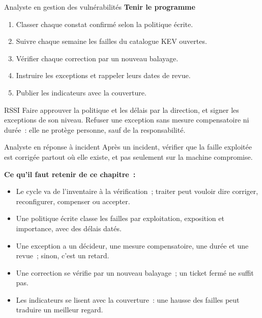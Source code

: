 \begin{boxmetier}{Analyste en gestion des vulnérabilités}
\textbf{Tenir le programme}
\begin{enumerate}
    \item Classer chaque constat confirmé selon la politique écrite.
    \item Suivre chaque semaine les failles du catalogue KEV ouvertes.
    \item Vérifier chaque correction par un nouveau balayage.
    \item Instruire les exceptions et rappeler leurs dates de revue.
    \item Publier les indicateurs avec la couverture.
\end{enumerate}
\end{boxmetier}

\begin{boxmetier}{RSSI}
Faire approuver la politique et les délais par la direction, et signer les
exceptions de son niveau. Refuser une exception sans mesure compensatoire ni
durée~: elle ne protège personne, sauf de la responsabilité.
\end{boxmetier}

\begin{boxmetier}{Analyste en réponse à incident}
Après un incident, vérifier que la faille exploitée est corrigée partout où
elle existe, et pas seulement sur la machine compromise.
\end{boxmetier}

\separateur

\begin{boxresume}
\textbf{Ce qu'il faut retenir de ce chapitre~:}
\begin{itemize}
    \item Le cycle va de l'inventaire à la vérification~; traiter peut
          vouloir dire corriger, reconfigurer, compenser ou accepter.
    \item Une politique écrite classe les failles par exploitation,
          exposition et importance, avec des délais datés.
    \item Une exception a un décideur, une mesure compensatoire, une durée
          et une revue~; sinon, c'est un retard.
    \item Une correction se vérifie par un nouveau balayage~; un ticket
          fermé ne suffit pas.
    \item Les indicateurs se lisent avec la couverture~: une hausse des
          failles peut traduire un meilleur regard.
\end{itemize}
\end{boxresume}

